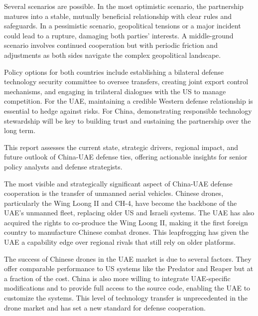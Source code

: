 \documentclass[10pt,a4paper]{article}
\begin{document}
{\small Several scenarios are possible. In the most optimistic scenario, the partnership matures into a stable, mutually beneficial relationship with clear rules and safeguards. In a pessimistic scenario, geopolitical tensions or a major incident could lead to a rupture, damaging both parties' interests. A middle-ground scenario involves continued cooperation but with periodic friction and adjustments as both sides navigate the complex geopolitical landscape.}\par
{\small Policy options for both countries include establishing a bilateral defense technology security committee to oversee transfers, creating joint export control mechanisms, and engaging in trilateral dialogues with the US to manage competition. For the UAE, maintaining a credible Western defense relationship is essential to hedge against risks. For China, demonstrating responsible technology stewardship will be key to building trust and sustaining the partnership over the long term.}\par
{\small This report assesses the current state, strategic drivers, regional impact, and future outlook of China-UAE defense ties, offering actionable insights for senior policy analysts and defense strategists.}\par
{}\par\vspace{1pt}
{\small The most visible and strategically significant aspect of China-UAE defense cooperation is the transfer of unmanned aerial vehicles. Chinese drones, particularly the Wing Loong II and CH-4, have become the backbone of the UAE's unmanned fleet, replacing older US and Israeli systems. The UAE has also acquired the rights to co-produce the Wing Loong II, making it the first foreign country to manufacture Chinese combat drones. This leapfrogging has given the UAE a capability edge over regional rivals that still rely on older platforms.}\par
{\small The success of Chinese drones in the UAE market is due to several factors. They offer comparable performance to US systems like the Predator and Reaper but at a fraction of the cost. China is also more willing to integrate UAE-specific modifications and to provide full access to the source code, enabling the UAE to customize the systems. This level of technology transfer is unprecedented in the drone market and has set a new standard for defense cooperation.}\par
\end{document}
